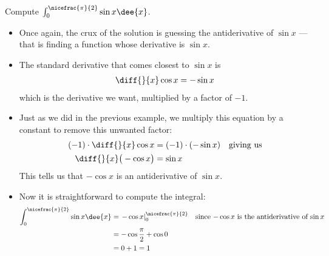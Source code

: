 \begin{eg}\label{eg:INTintegralB}
Compute $\int_0^{\nicefrac{\pi}{2}} \sin x\dee{x}$.

\soln
\begin{itemize}
 \item Once again, the crux of the solution is guessing the antiderivative of $\sin x$
--- that is finding a function whose derivative  is $\sin x$.
\item The standard derivative that comes closest to $\sin x$ is
\begin{align*}
\diff{}{x}\cos x = -\sin x
\end{align*}
which is the derivative we want, multiplied by a factor of $-1$.
\item Just as we did in the previous example, we multiply this equation by a constant to
remove this unwanted factor:
\begin{align*}
(-1)\cdot \diff{}{x}\cos x &= (-1)\cdot(-\sin x) &\text{giving us}\\
\diff{}{x}\big(-\cos x\big) &= \sin x
\end{align*}
This tells us that $-\cos x$ is an antiderivative of $\sin x$.
\item Now it is straightforward to compute the integral:
\begin{align*}
\int_0^{\nicefrac{\pi}{2}} \sin x\dee{x}
&= \left.-\cos x \right|_0^{\nicefrac{\pi}{2}}
&\text{since $-\cos x$ is the antiderivative of $\sin x$}\\
&= -\cos\frac{\pi}{2}+\cos 0 \\
&= 0+1=1
\end{align*}
\end{itemize}

\end{eg}



